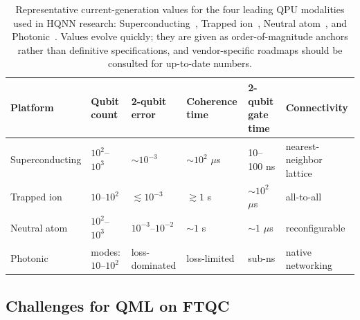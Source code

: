 \documentclass[aps,10pt,groupedaddress,prx,superscriptaddress,twocolumn,balancelastpage, tightenlines]{revtex4-2}
\theoremstyle{plain}  %
\begin{document}
\begin{table}[htbp!]
\centering
\caption{Representative current-generation values for the four leading \gls{QPU} modalities used in \gls{HQNN} research: Superconducting~\cite{kim2023evidence}, Trapped ion~\cite{decross2024computational}, Neutral atom~\cite{balewski2024engineering, bluvstein2024logical}, and Photonic~\cite{bourassa2021blueprint}. Values evolve quickly; they are given as order-of-magnitude anchors rather than definitive specifications, and vendor-specific roadmaps should be consulted for up-to-date numbers.}
\label{tab:hqnn_qpus}
{\rmfamily
\begin{tabular}{@{}llllll@{}}
\toprule
Platform & Qubit count & 2-qubit error & Coherence time & 2-qubit gate time & Connectivity \\
\midrule
Superconducting                             & $10^{2}$--$10^{3}$       & $\sim\!10^{-3}$       & $\sim\!10^{2}$ $\mu$s   & 10--100 ns            & nearest-neighbor lattice \\
Trapped ion                       & $10$--$10^{2}$           & $\lesssim\!10^{-3}$   & $\gtrsim\!1$ s          & $\sim\!10^{2}$ $\mu$s  & all-to-all \\
Neutral atom  & $10^{2}$--$10^{3}$       & $10^{-3}$--$10^{-2}$  & $\sim\!1$ s             & $\sim\!1$ $\mu$s       & reconfigurable \\
Photonic                              & modes: $10$--$10^{2}$    & loss-dominated        & loss-limited            & sub-ns                 & native networking \\
\bottomrule
\end{tabular}}
\end{table}
    

\subsection{Challenges for QML on FTQC}\label{subsec:FTQC_challenges}
\end{document}
